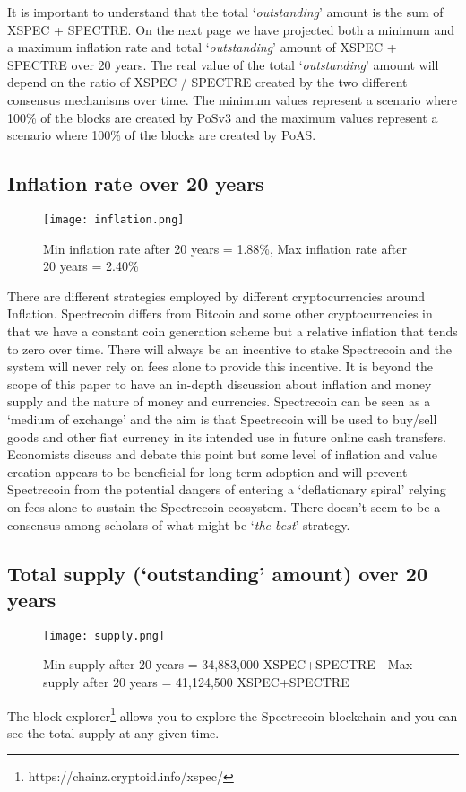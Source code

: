 \noindent
It is important to understand that the total ‘\textit{outstanding}’ amount is the sum
of \linebreak XSPEC + SPECTRE. On the next page we have projected both a minimum and a
maximum inflation rate and total ‘\textit{outstanding}’ amount of XSPEC + SPECTRE over
20 years. The real value of the total ‘\textit{outstanding}’ amount will depend on the
ratio of XSPEC / SPECTRE created by the two different consensus mechanisms
over time. The minimum values represent a scenario where 100\% of the blocks
are created by PoSv3 and the maximum values represent a scenario where 100\%
of the blocks are created by PoAS.
\newpage

\subsection{Inflation rate over 20 years}
\begin{figure}[h!]
	\centering
	\texttt{[image: inflation.png]}
	\caption{Min inflation rate after 20 years = 1.88\%, Max inflation 
	rate after 20 years = 2.40\% }
\end{figure}
\noindent
There are different strategies employed by different cryptocurrencies around 
Inflation. Spectrecoin differs from Bitcoin and some other 
cryptocurrencies in that we have a constant coin generation scheme 
but a relative inflation that tends to zero over time. There will 
always be an incentive to stake Spectrecoin and the system will never 
rely on fees alone to provide this incentive. It is beyond the scope 
of this paper to have an in-depth discussion about inflation and money 
supply and the nature of money and currencies. Spectrecoin can be seen 
as a ‘medium of exchange’ and the aim is that Spectrecoin will be used 
to buy/sell goods and other fiat currency in its intended use in future 
online cash transfers. Economists discuss and debate this point but some 
level of inflation and value creation appears to be beneficial for long 
term adoption and will prevent Spectrecoin from the potential dangers of 
entering a ‘deflationary spiral’ relying on fees alone to sustain the 
Spectrecoin ecosystem. There doesn’t seem to be a consensus among 
scholars of what might be ‘\textit{the best}’ strategy.
\newpage

\subsection{Total supply (‘outstanding’ amount) over 20 years}
\begin{figure}[ht]
	\centering
	\texttt{[image: supply.png]}
	\caption{Min supply after 20 years = 34,883,000 XSPEC+SPECTRE - Max 
		supply after 20 years = 41,124,500 XSPEC+SPECTRE}
\end{figure}
\noindent
The block explorer\footnote{https://chainz.cryptoid.info/xspec/} allows you 
to explore the Spectrecoin blockchain and you can see the total supply at any given time.

